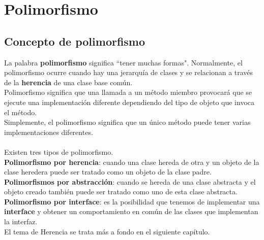 \documentclass[12pt,a4paper]{report}
\begin{document}
\chapter{Polimorfismo}
\section{Concepto de polimorfismo}
La palabra \textbf{polimorfismo} significa ``tener muchas formas". Normalmente, el polimorfismo ocurre cuando hay una jerarquía de clases y se relacionan a través de la\textbf{ herencia} de una clase base común.\\Polimorfismo significa que una llamada a un método miembro provocará que se ejecute una implementación diferente dependiendo del tipo de objeto que invoca el método.\\Simplemente, el polimorfismo significa que un único método puede tener varias implementaciones diferentes.\\\\Existen tres tipos de polimorfismo.\\\textbf{Polimorfismo por herencia}: cuando una clase hereda de otra y un objeto de la clase heredera puede ser tratado como un objeto de la clase padre.\\\textbf{Polimorfismos por abstracción}: cuando se hereda de una clase abstracta y el objeto creado también puede ser tratado como uno de esta clase abstracta.\\\textbf{Polimorfismo por interface}: es la posibilidad que tenemos de implementar una\textbf{ interface} y obtener un comportamiento en común de las clases que implementan la interfaz.\\El tema de Herencia se trata más a fondo en el siguiente capítulo.
\end{document}

